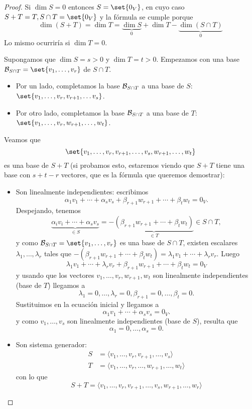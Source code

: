 \begin{proof}
	Si \(\dim S = 0 \) entonces \(S = \set{0_V }\), en cuyo caso \(S + T = T, S \cap T = \set{0_V }\) y la fórmula se cumple porque
	\[
		\dim (S + T) = \dim T = \underbrace{\dim S}_{0} + \dim T - \underbrace{\dim(S \cap T)}_{0}
	\]
	Lo mismo ocurriría si \(\dim T = 0\).

	Supongamos que \(\dim S = s > 0 \) y \(\dim T = t > 0 \). Empezamos con una base \(\mathcal{\MakeUppercase{b}}_{S \cap T} = \set{v_1, \ldots, v_r }\) de \(S \cap  T \).
	\begin{itemize}
		\item Por un lado, completamos la base \(\mathcal{\MakeUppercase{b}}_{S \cap T }\) a una base de \(S \): \(\set{v_1, \ldots, v_r, v_{r+1}, \ldots v_s }\).
		\item Por otro lado, completamos la base \(\mathcal{\MakeUppercase{b}}_{S \cap T }\) a una base de \(T \): \(\set{v_1, \ldots, v_r, w_{r+1}, \ldots, w_t }\).
	\end{itemize}
	Veamos que
	\[
		\set{v_1, \ldots, v_r, v_{r+1}, \ldots, v_s, w_{r+1}, \ldots, w_t }
	\]
	es una base de \(S + T \) (si probamos esto, estaremos viendo que \(S+ T \) tiene una base con \(s + t - r \) vectores, que es la fórmula que queremos demostrar):
	\begin{itemize}
		\item Son linealmente independientes: escribimos
		      \[
			      \alpha_1 v_1 + \cdots + \alpha_s v_s + \beta_{r+1}w_{r+1} + \cdots + \beta_t w_t = 0_V.
		      \]
		      Despejando, tenemos
		      \[
			      \underbrace{\alpha_i v_i + \cdots + \alpha_s v_s}_{\in S} = - \underbrace{(\beta_{r+1} w_{r+1} + \cdots + \beta_t w_t)}_{\in  T} \in S \cap  T,
		      \]
		      y como \(\mathcal{\MakeUppercase{b}}_{S \cap  T} = \set{v_1, \ldots, v_r }\) es una base de \(S \cap  T \), existen escalares \(\lambda_1, \ldots, \lambda_r \) tales que \(-(\beta_{r+1} w_{r+1} + \cdots + \beta_t w_t ) = \lambda_1 v_1 + \cdots + \lambda_r v_r \). Luego
		      \[
			      \lambda_1 v_1 + \cdots + \lambda_r v_r + \beta_{r+1} w_{r+1} + \cdots + \beta_t w_t = 0_V
		      \]
		      y usando que los vectores \(v_1, \ldots, v_r, w_{r+1}, w_t \) son linealmente independientes (base de \(T \)) llegamos a
		      \[
			      \lambda_1 = 0, \ldots, \lambda_r = 0, \boxed{\beta_{r+1} = 0}, \ldots, \boxed{\beta_t = 0}.
		      \]
		      Sustituimos en la ecuación inicial y llegamos a
		      \[
			      \alpha_1 v_1 + \cdots + \alpha_s v_s = 0_V.
		      \]
		      y como \(v_1, \ldots, v_s \) son linealmente independientes (base de \(S \)), resulta que
		      \[
			      \boxed{\alpha_1 = 0}, \ldots, \boxed{\alpha_s = 0 }.
		      \]
		\item Son sistema generador:
		      \begin{align*}
			      S & = \langle v_1, \ldots, v_r, v_{r+1}, \ldots, v_s \rangle         \\
			      T & = \langle v_1, \ldots, v_r, \ldots, w_{r+1}, \ldots, w_t \rangle
		      \end{align*}
		      con lo que
		      \[
			      S + T = \langle v_1, \ldots, v_r, v_{r+1}, \ldots, v_s, w_{r+1}, \ldots, w_r \rangle
		      \]
	\end{itemize}
\end{proof}
